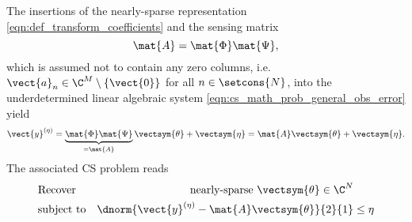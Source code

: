 The insertions of
the nearly-sparse representation
\eqref{eqn:def_transform_coefficients} and
the sensing matrix
\begin{equation}
  \mat{A}
  =
  \mat{\Phi}
  \mat{\Psi},
 \label{eqn:cs_math_prob_general_sensing_matrix}
\end{equation}
which
is assumed not to contain
any zero columns, i.e.
$\vect{a}_{n} \in \C^{ M } \setminus \{ \vect{0} \}$ for
all $n \in \setcons{ N }$, into
the underdetermined linear algebraic system
\eqref{eqn:cs_math_prob_general_obs_error} yield
\begin{equation}
  \vect{y}^{(\eta)}
  =
  \underbrace{
    \mat{\Phi}
    \mat{\Psi}
  }_{ = \mat{A} }
  \vectsym{\theta}
  +
  \vectsym{\eta}
  =
  \mat{A}
  \vectsym{\theta}
  +
  \vectsym{\eta}.
 \label{eqn:cs_math_prob_general_obs_trans_coef_error}
\end{equation}
The associated \ac{CS} problem reads
\begin{equation}
\begin{alignedat}{2}
  &
  \text{Recover}
  &
  \text{nearly-sparse }
  \vectsym{\theta}
  \in
  \C^{ N }\\
  &
  \text{subject to}
  \quad
  &
  \dnorm{ \vect{y}^{(\eta)} - \mat{A} \vectsym{\theta} }{2}{1}
  &\leq
  \eta
\end{alignedat}
\label{eqn:cs_math_prob_general}
\end{equation}
